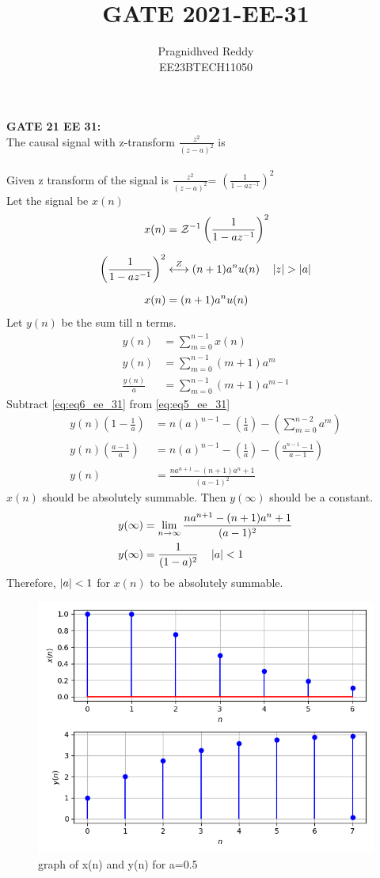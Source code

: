 \documentclass[journal,12pt,twocolumn]{IEEEtran}
\title{GATE 2021-EE-31}
\author{Pragnidhved Reddy\\EE23BTECH11050}
\date{}
\begin{document}
\maketitle
\newpage
\bigskip
\textbf{GATE 21 EE 31:}\\
The causal signal with z-transform $\frac{z^2}{(z-a)^{2}}$  is \\
\solution\\
Given z transform of the signal is $\frac{z^2}{(z-a)^{2}}$= $\left(\frac{1}{1-az^{-1}}\right)^2$\\
Let the signal be $x(n)$
\begin{align}
x(n)&=\mathcal{Z}^{-1}\left(\frac{1}{1-az^{-1}}\right)^2\\[6pt]
\left(\frac{1}{1-az^{-1}}\right)^2&\overset{Z}\longleftrightarrow (n+1)a^nu(n)\quad \left\vert z\right\vert>\left\vert a\right\vert\\[6pt] 
x(n)&=(n+1)a^n u(n)
\end{align}
 Let $y(n)$ be the sum till n terms.
\begin{align}
y(n)&=\sum_{m=0}^{n-1}x(n)\\
\label{eq:eq5_ee_31}
y(n)&=\sum_{m=0}^{n-1}(m+1)a^m\\
\label{eq:eq6_ee_31}
\frac{y(n)}{a}&=\sum_{m=0}^{n-1}(m+1)a^{m-1}
\end{align}
Subtract \eqref{eq:eq6_ee_31} from \eqref{eq:eq5_ee_31}
\begin{align}
y(n)\left(1-\frac{1}{a}\right)&=n(a)^{n-1}-\left(\frac{1}{a}\right)-\left(\sum_{m=0}^{n-2}a^{m}\right)\\
y(n)\left(\frac{a-1}{a}\right)&=n(a)^{n-1}-\left(\frac{1}{a}\right)-\left(\frac{a^{n-1}-1}{a-1}\right)\\
y(n)&=\frac{na^{n+1}-(n+1)a^{n}+1}{(a-1)^2} 
\end{align}
$x(n)$ should be absolutely summable.  Then $y(\infty)$ should be a constant.
\begin{align}
y(\infty)&=\lim_{n\to \infty}\frac{na^{n+1}-(n+1)a^{n}+1}{(a-1)^2} \\
y(\infty)&=\frac{1}{(1-a)^2} \quad \left\vert a\right\vert<1
\end{align}
Therefore, $\left\vert a\right\vert<1$ for $x(n)$ to be absolutely summable.
\begin{figure}[h!]
    \centering
    \includegraphics[width=\columnwidth]{figs/plot.png}
    \caption{graph of x(n) and y(n) for a=0.5}
    \label{fig:1}
\end{figure}
\end{document}
